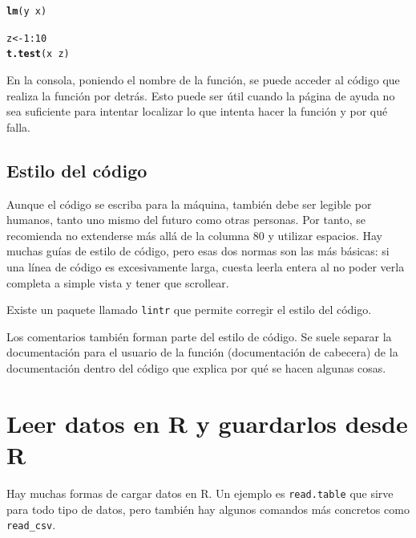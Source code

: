 \documentclass{config/apuntes}\usepackage[]{graphicx}\usepackage[]{xcolor}
\makeatletter
\newcommand{\hlnum}[1]{\textcolor[rgb]{0.686,0.059,0.569}{#1}}%
\newcommand{\hlopt}[1]{\textcolor[rgb]{0,0,0}{#1}}%
\newcommand{\hldef}[1]{\textcolor[rgb]{0.345,0.345,0.345}{#1}}%
\newcommand{\hlkwb}[1]{\textcolor[rgb]{0.69,0.353,0.396}{#1}}%
\newcommand{\hlkwd}[1]{\textcolor[rgb]{0.737,0.353,0.396}{\textbf{#1}}}%
\newenvironment{kframe}{%
 \def\at@end@of@kframe{}%
 \ifinner\ifhmode%
  \def\at@end@of@kframe{\end{minipage}}%
  \begin{minipage}{\columnwidth}%
 \fi\fi%
 \def\FrameCommand##1{\hskip\@totalleftmargin \hskip-\fboxsep
 \colorbox{shadecolor}{##1}\hskip-\fboxsep
     \hskip-\linewidth \hskip-\@totalleftmargin \hskip\columnwidth}%
 \MakeFramed {\advance\hsize-\width
   \@totalleftmargin\z@ \linewidth\hsize
   \@setminipage}}%
 {\par\unskip\endMakeFramed%
 \at@end@of@kframe}
\newenvironment{knitrout}{}{} %
\newcommand{\code}[1]{\texttt{#1}}
\makeatother
\begin{document}
\begin{knitrout}
\begin{kframe}
{\ttfamily\noindent\bfseries\color{errorcolor}{\#\# Error in xy.coords(x, y, xlabel, ylabel, log): 'x' and 'y' lengths differ}}\begin{alltt}
\hlkwd{lm}\hldef{(y} \hlopt{~} \hldef{x)}
\end{alltt}


{\ttfamily\noindent\bfseries{}}\begin{alltt}
\hldef{z} \hlkwb{<-} \hlnum{1}\hlopt{:}\hlnum{10}
\hlkwd{t.test}\hldef{(x} \hlopt{~} \hldef{z)}
\end{alltt}


{\ttfamily\noindent\bfseries{}}\end{kframe}
\end{knitrout}

En la consola, poniendo el nombre de la función, se puede acceder al código que realiza la función por detrás. Esto puede ser útil cuando la página de ayuda no sea suficiente para intentar localizar lo que intenta hacer la función y por qué falla.

\section{Estilo del código}
Aunque el código se escriba para la máquina, también debe ser legible por humanos, tanto uno mismo del futuro como otras personas. Por tanto, se recomienda no extenderse más allá de la columna 80 y utilizar espacios. Hay muchas guías de estilo de código, pero esas dos normas son las más básicas: si una línea de código es excesivamente larga, cuesta leerla entera al no poder verla completa a simple vista y tener que scrollear. 

Existe un paquete llamado \code{lintr} que permite corregir el estilo del código. 

Los comentarios también forman parte del estilo de código. Se suele separar la documentación para el usuario de la función (documentación de cabecera) de la documentación dentro del código que explica por qué se hacen algunas cosas.

\chapter{Leer datos en R y guardarlos desde R}
Hay muchas formas de cargar datos en R. Un ejemplo es \code{read.table} que sirve para todo tipo de datos, pero también hay algunos comandos más concretos como \code{read\_csv}.
\end{document}
